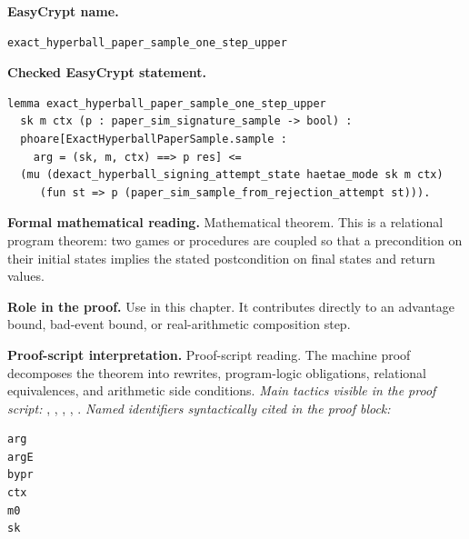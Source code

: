\begin{formaltheorem}
\noindent\textbf{EasyCrypt name.}
\begin{lstlisting}[language=EasyCrypt,basicstyle=\ttfamily\scriptsize]
exact_hyperball_paper_sample_one_step_upper
\end{lstlisting}
\noindent\textbf{Checked EasyCrypt statement.}
\begin{lstlisting}[language=EasyCrypt,basicstyle=\ttfamily\scriptsize]
lemma exact_hyperball_paper_sample_one_step_upper
  sk m ctx (p : paper_sim_signature_sample -> bool) :
  phoare[ExactHyperballPaperSample.sample :
    arg = (sk, m, ctx) ==> p res] <=
  (mu (dexact_hyperball_signing_attempt_state haetae_mode sk m ctx)
     (fun st => p (paper_sim_sample_from_rejection_attempt st))).
\end{lstlisting}
\noindent\textbf{Formal mathematical reading.}
Mathematical theorem. This is a relational program theorem: two games or procedures are coupled so that a precondition on their initial states implies the stated postcondition on final states and return values.

\noindent\textbf{Role in the proof.}
Use in this chapter. It contributes directly to an advantage bound, bad-event bound, or real-arithmetic composition step.

\noindent\textbf{Proof-script interpretation.}
Proof-script reading. The machine proof decomposes the theorem into rewrites, program-logic obligations, relational equivalences, and arithmetic side conditions.
\emph{Main tactics visible in the proof script:} , , , , .
\emph{Named identifiers syntactically cited in the proof block:}
\begin{lstlisting}[language=EasyCrypt,basicstyle=\ttfamily\scriptsize]
arg
argE
bypr
ctx
m0
sk
\end{lstlisting}

\end{formaltheorem}

